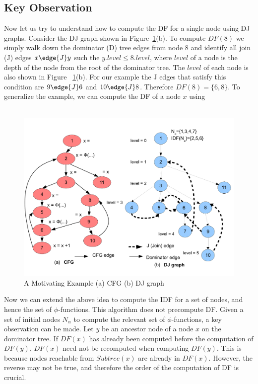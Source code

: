 \subsection{Key Observation} 
 
Now let us try to understand how to compute the DF for a single node using DJ graphs. 
Consider  the DJ graph shown in Figure~\ref{fig:cfg}(b). To compute $DF(8)$ we simply walk down the
dominator (D) tree edges from node 8 and identify all join (J) edges $x \edge{J} y$ such
the $y.level \leq 8.level$, where $level$ of a node is the depth of the node from the
root of the dominator tree. The $level$ of each node is also shown in Figure ~\ref{fig:cfg}(b).
For our example the J edges that satisfy this 
condition are $9 \edge{J} 6$ and $10 \edge{J} 8$. Therefore $DF(8) = \{6, 8\}$. To generalize the example, we can
compute the DF of a node $x$ using \\
\\

    \begin{figure}[htb]
    \centerline{\includegraphics[scale=0.4]{cfglive_new.pdf}}
    \caption{A Motivating Example (a) CFG (b) DJ graph}
    \label{fig:cfg}
    \end{figure} 

Now we can extend the above idea to compute the IDF for a set of nodes, and hence the set of $\phi$-functions. This algorithm does not precompute DF. Given a set of initial nodes $N_{\alpha}$ to compute the relevant set of $\phi$-functions,
a key observation can be made. Let $y$ be an ancestor node of a node $x$ on the dominator tree. If $DF(x)$ has already been computed before the computation of $DF(y)$,  $DF(x)$ need not
be recomputed when computing $DF(y)$. This is because nodes reachable from $Subtree(x)$ are already in $DF(x)$. However, the reverse may not be true, and  therefore the order of the computation of DF is crucial.

